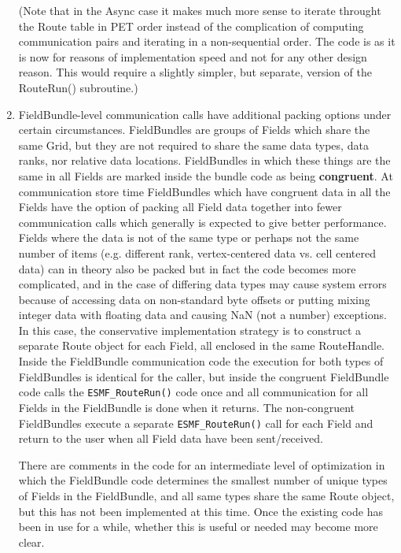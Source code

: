 \begin{enumerate}
\begin{enumerate}
\end{enumerate}
(Note that in the Async case it makes much more sense to iterate
throught the Route table in PET order instead of the complication
of computing communication pairs and iterating in a non-sequential
order.  The code is as it is now for reasons of implementation speed
and not for any other design reason.  This would require a slightly
simpler, but separate, version of the RouteRun() subroutine.)

\item

FieldBundle-level communication calls have additional packing options
under certain circumstances.  FieldBundles are groups of Fields which
share the same Grid, but they are not required to share the same
data types, data ranks, nor relative data locations.  FieldBundles
in which these things are the same in all Fields are marked inside the
bundle code as being {\bf congruent}.  At communication store time
FieldBundles which have congruent data in all the Fields have the option
of packing all Field data together into fewer communication calls
which generally is expected to give better performance.   
Fields where the data is not of the same type or perhaps not
the same number of items (e.g. different rank, vertex-centered data
vs. cell centered data) can in theory also be packed but in fact
the code becomes more complicated, and in the case of differing
data types may cause system errors because of accessing data
on non-standard byte offsets or putting mixing integer data
with floating data and causing NaN (not a number) exceptions.
In this case, the conservative implementation strategy is to construct 
a separate Route object for each Field, all enclosed in the same
RouteHandle.  Inside the FieldBundle communication code the execution
for both types of FieldBundles is identical for the caller, but inside
the congruent FieldBundle code calls the {\tt ESMF\_RouteRun()} code
once and all communication for all Fields in the FieldBundle is done
when it returns.  The non-congruent FieldBundles execute a separate
{\tt ESMF\_RouteRun()} call for each Field and return to the user 
when all Field data have been sent/received.

There are comments in the code for an intermediate level of
optimization in which the FieldBundle code determines the smallest
number of unique types of Fields in the FieldBundle, and all same types
share the same Route object, but this has not been implemented
at this time.  Once the existing code has been in use for a while,
whether this is useful or needed may become more clear.



\end{enumerate}

